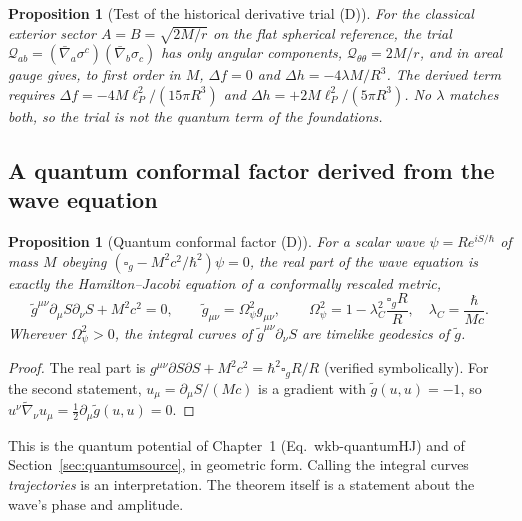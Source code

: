 \documentclass[11pt,a4paper]{article}
\newtheorem{proposition}[theorem]{Proposition}
\begin{document}
\begin{proposition}[Test of the historical derivative trial (D)]\label{prop:trialtest}
For the classical exterior sector $A=B=\sqrt{2M/r}$ on the flat spherical
reference, the trial $\mathcal Q_{ab}=(\bar\nabla_a\sigma^c)(\bar\nabla_b\sigma_c)$ has
only angular components, $\mathcal Q_{\theta\theta}=2M/r$, and in areal gauge gives,
to first order in $M$, $\Delta f=0$ and $\Delta h=-4\lambda M/R^3$. The derived term
requires $\Delta f=-4M\ell_P^2/(15\pi R^3)$ and $\Delta h=+2M\ell_P^2/(5\pi R^3)$.
No $\lambda$ matches both, so the trial is not the quantum term of the foundations.
\end{proposition}

\subsection{A quantum conformal factor derived from the wave equation}
\begin{proposition}[Quantum conformal factor (D)]\label{prop:qcf}
For a scalar wave $\psi=Re^{iS/\hbar}$ of mass $M$ obeying
$(\square_g-M^2c^2/\hbar^2)\psi=0$, the real part of the wave equation is exactly the
Hamilton--Jacobi equation of a conformally rescaled metric,
\begin{equation}\label{eq:qcf}
\tilde g^{\mu\nu}\partial_\mu S\partial_\nu S+M^2c^2=0,\qquad
\tilde g_{\mu\nu}=\Omega_\psi^2g_{\mu\nu},\qquad
\Omega_\psi^2=1-\lambda_C^2\frac{\square_gR}{R},\quad\lambda_C=\frac\hbar{Mc}.
\end{equation}
Wherever $\Omega_\psi^2>0$, the integral curves of $\tilde g^{\mu\nu}\partial_\nu S$
are timelike geodesics of $\tilde g$.
\end{proposition}
\begin{proof}
The real part is $g^{\mu\nu}\partial S\partial S+M^2c^2=\hbar^2\square_gR/R$ (verified
symbolically). For the second statement, $u_\mu=\partial_\mu S/(Mc)$ is a gradient
with $\tilde g(u,u)=-1$, so $u^\nu\tilde\nabla_\nu u_\mu=\frac12\partial_\mu\tilde g(u,u)=0$.
\end{proof}
\noindent This is the quantum potential of Chapter~1 (Eq.~wkb-quantumHJ) and of
Section~\ref{sec:quantumsource}, in geometric form. Calling the integral curves
\emph{trajectories} is an interpretation. The theorem itself is a statement about
the wave's phase and amplitude.
\end{document}
